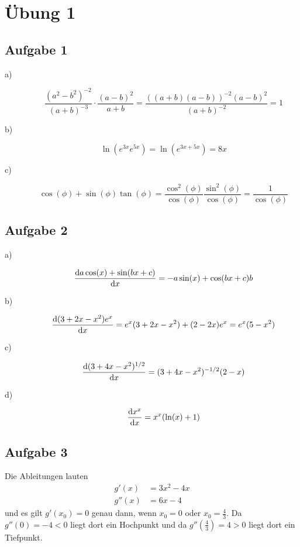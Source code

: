 \chapter*{Übung 1}

\section*{Aufgabe 1}

\begin{description}
	\item[a)] 
	\[
		\frac{(a^2 - b^2)^{-2}}{(a + b)^{-3}} \cdot \frac{(a - b)^2}{a + b}
		= \frac{((a + b)(a - b))^{-2} (a - b)^2}{(a + b)^{-2}}
		= 1
	\] 
	
	\item[b)]
	\[
		\ln(e^{3x} e^{5x}) = \ln(e^{3x + 5x}) 
		= 8x
	\]
	
	\item[c)]
	\[
		\cos(\phi) + \sin(\phi) \tan(\phi) 
		= \frac{\cos^2(\phi)}{\cos(\phi)} \frac{\sin^2(\phi)}{\cos(\phi)}
		= \frac{1}{\cos(\phi)} 
	\]
\end{description}

\section*{Aufgabe 2}

\begin{description}
	\item[a)] 
	\[
		\frac{\mathrm{d}a \cos(x) + \sin(bx + c)}{\mathrm{d}x} = - a \sin(x) + \cos(bx + c) b
	\] 
	
	\item[b)]
	\[
		\frac{\mathrm{d}(3 + 2x - x^2)e^x}{\mathrm{d}x} = e^x (3 + 2x - x^2) + (2 - 2x)e^x = e^x (5 - x^2)
	\]
	
	\item[c)]
	\[
		\frac{\mathrm{d}(3 + 4x - x^2)^{1/2}}{\mathrm{d}x} = (3 + 4x - x^2)^{-1/2} (2 - x)
	\]
	
	\item[d)]
	\[
		\frac{\mathrm{d}x^x}{\mathrm{d}x} = x^x (\ln(x) + 1)
	\]
\end{description}

\section*{Aufgabe 3}
Die Ableitungen lauten
\begin{align*}
	g'(x) &= 3x^2 - 4x \\	
	g''(x) &= 6x - 4
\end{align*}
und es gilt $g'(x_0) = 0$ genau dann, wenn $x_0 = 0$ oder $x_0 = \frac{4}{3}$. Da $g''(0) = -4 < 0$ liegt dort ein Hochpunkt und da $g''(\frac{4}{3}) = 4 > 0$ liegt dort ein Tiefpunkt.

